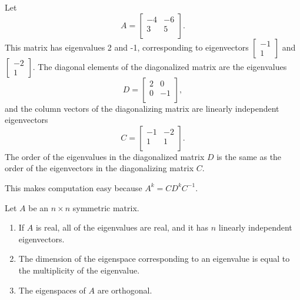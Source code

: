 \documentclass{article}
\begin{document}
    Let
    \[
    A = 
    \begin{bmatrix}
        -4 & -6 \\
        3 & 5 \\
    \end{bmatrix}.
    \]
    This matrix has eigenvalues 2 and -1, 
    corresponding to eigenvectors $\begin{bmatrix} -1 \\ 1 \end{bmatrix}$ and $\begin{bmatrix} -2 \\ 1 \end{bmatrix}$. 
    The diagonal elements of the diagonalized matrix are the eigenvalues
    \[
    D = 
    \begin{bmatrix}
        2 & 0 \\
        0 & -1 \\
    \end{bmatrix},
    \]
    and the column vectors of the diagonalizing matrix are linearly independent eigenvectors
    \[
    C = 
    \begin{bmatrix}
        -1 & -2 \\
        1 & 1 \\
    \end{bmatrix}.
    \]
    The order of the eigenvalues in the diagonalized matrix $D$
    is the same as the order of the eigenvectors in the diagonalizing matrix $C$.

    This makes computation easy because $A^k = CD^kC^{-1}$. 

    Let $A$ be an $n \times n$ symmetric matrix. 
    \begin{enumerate}
        \item If $A$ is real, all of the eigenvalues are real, and it has $n$ linearly independent eigenvectors.
        \item The dimension of the eigenspace corresponding to an eigenvalue is equal to the multiplicity of the eigenvalue.
        \item The eigenspaces of $A$ are orthogonal. 
    \end{enumerate}
\end{document}
